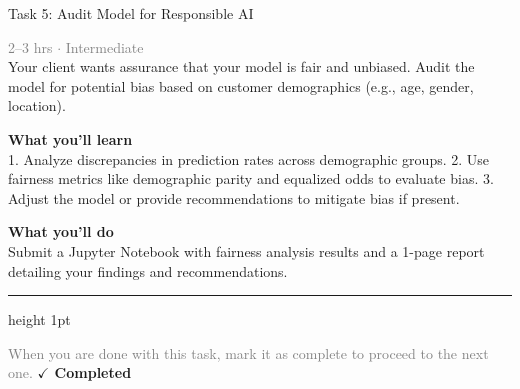 \documentclass[10pt,a4paper]{article}
\begin{document}
\begin{taskbox}{Task 5: Audit Model for Responsible AI}

    {\small \textcolor{gray}{2--3 hrs $\cdot$ Intermediate}}\\[12pt]

      
Your client wants assurance that your model is fair and unbiased. Audit the model for potential bias based on customer demographics (e.g., age, gender, location).


\vspace{8pt}
{\large \textbf{\textcolor{brandLight}{What you'll learn}}}\\[4pt]  
1. Analyze discrepancies in prediction rates across demographic groups.  
2. Use fairness metrics like demographic parity and equalized odds to evaluate bias.  
3. Adjust the model or provide recommendations to mitigate bias if present.  

\vspace{8pt}
{\large \textbf{\textcolor{brandLight}{What you'll do}}}\\[4pt]  
Submit a Jupyter Notebook with fairness analysis results and a 1-page report detailing your findings and recommendations.\par

    \vspace{16pt}

    \textcolor{cardBorder}{\hrule height 1pt}\vspace{8pt}

    \small \textcolor{gray}{When you are done with this task, mark it as complete to proceed to the next one.} \hfill \textbf{\textcolor{brandDark}{$\checkmark$ Completed}}

\end{taskbox}
\end{document}

